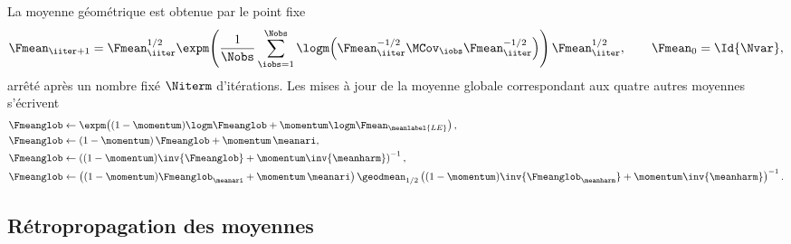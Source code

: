 La moyenne géométrique est obtenue par le point fixe 
\begin{equation}
  \Fmean_{\iiter+1}
  =
  \Fmean_{\iiter}^{1/2}
  \expm\!\left(\frac{1}{\Nobs}\sum_{\iobs=1}^{\Nobs}
    \logm\!\left(\Fmean_{\iiter}^{-1/2}\MCov_\iobs\Fmean_{\iiter}^{-1/2}\right)\right)
  \Fmean_{\iiter}^{1/2},
  \qquad \Fmean_0=\Id{\Nvar},
  \label{eq:spdnet-geometrique-iteration}
\end{equation}
arrêté après un nombre fixé $\Niterm$ d'itérations. Les mises à jour de la
moyenne globale correspondant aux quatre autres moyennes s'écrivent
\begin{align}
  \Fmeanglob &\gets \expm\!\left((1-\momentum)\logm\Fmeanglob+\momentum\logm\Fmean_{\meanlabel{LE}}\right),
  \label{eq:spdnet-momentum-le}\\
  \Fmeanglob &\gets (1-\momentum)\,\Fmeanglob+\momentum\,\meanari,
  \label{eq:spdnet-momentum-ari}\\
  \Fmeanglob &\gets \left((1-\momentum)\inv{\Fmeanglob}+\momentum\inv{\meanharm}\right)^{-1},
  \label{eq:spdnet-momentum-harm}\\
  \Fmeanglob &\gets \left((1-\momentum)\Fmeanglob_{\meanari}+\momentum\,\meanari\right)
    \geodmean_{1/2}
    \left((1-\momentum)\inv{\Fmeanglob_{\meanharm}}+\momentum\inv{\meanharm}\right)^{-1}.
  \label{eq:spdnet-momentum-gah}
\end{align}


\subsection{Rétropropagation des moyennes}
\label{sec:spdnet-batchnorm-gradmoyennes}

